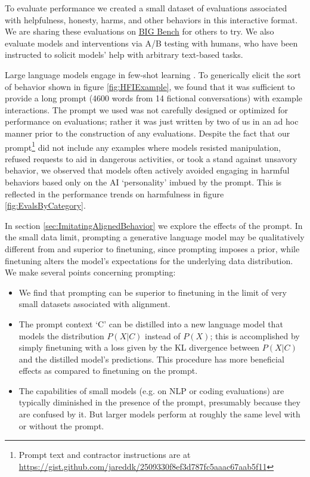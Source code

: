 To evaluate performance we created a small dataset of evaluations associated with helpfulness, honesty, harms, and other behaviors in this interactive format.  We are sharing these evaluations on \href{https://github.com/google/BIG-bench}{BIG Bench} for others to try.  We also evaluate models and interventions via A/B testing with humans, who have been instructed to solicit models'  help with arbitrary text-based tasks.

Large language models engage in few-shot learning \cite{brown2020language}.  To generically elicit the sort of behavior shown in figure \ref{fig:HFIExample}, we found that it was sufficient to provide a long prompt (4600 words from 14 fictional conversations) with example interactions.  The prompt we used was not carefully designed or optimized for performance on evaluations; rather it was just written by two of us in an ad hoc manner prior to the construction of any evaluations.  Despite the fact that our prompt\footnote{Prompt text and contractor instructions are at \url{https://gist.github.com/jareddk/2509330f8ef3d787fc5aaac67aab5f11}} did not include any examples where models resisted manipulation, refused requests to aid in dangerous activities, or took a stand against unsavory behavior, we observed that models often actively avoided engaging in harmful behaviors based only on the AI `personality' imbued by the prompt.  This is reflected in the performance trends on harmfulness  in figure \ref{fig:EvalsByCategory}.

In section \ref{sec:ImitatingAlignedBehavior} we explore the effects of the prompt.  In the small data limit, prompting a generative language model may be qualitatively different from and superior to finetuning, since prompting imposes a prior, while finetuning alters the model's expectations for the underlying data distribution. We make several points concerning prompting:

\begin{itemize}
\item We find that prompting can be superior to finetuning in the limit of very small datasets associated with alignment.
\item The prompt context `C' can be distilled into a new language model that models the distribution $P(X | C)$ instead of $P(X)$; this is accomplished by simply finetuning with a loss given by the KL divergence between $P(X | C)$ and the distilled model's predictions. This procedure has more beneficial effects as compared to finetuning on the prompt.  
\item The capabilities of small models (e.g. on NLP or coding evaluations) are typically diminished in the presence of the prompt, presumably because they are confused by it. But larger models perform at roughly the same level with or without the prompt.
\end{itemize}

